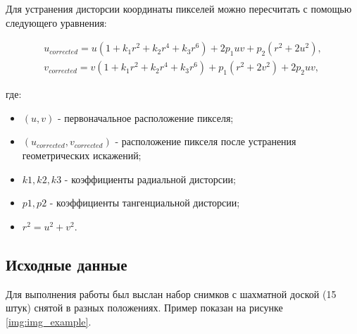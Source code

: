 	Для устранения дисторсии координаты пикселей можно пересчитать с помощью следующего уравнения:
	
	\begin{gather*}
		u_{corrected} = u(1 + k_1 r^2 + k_2 r^4 + k_3 r^6) + 2 p_1 u v + p_2 (r^2 + 2 u^2) , \\
		v_{corrected} = v(1 + k_1 r^2 + k_2 r^4 + k_3 r^6) + p_1 (r^2 + 2 v^2) + 2 p_2 u v ,
	\end{gather*}
	
	где: 
	\begin{itemize}
		\renewcommand{\labelitemi}{--}
		\item $(u, v)$ - первоначальное расположение пикселя;
		\item $(u_{corrected}, v_{corrected})$ - расположение пикселя после устранения геометрических искажений;
		\item $k1, k2, k3$ - коэффициенты радиальной дисторсии;
		\item $p1, p2$ - коэффициенты тангенциальной дисторсии;
		\item $r^2 = u^2 + v^2$.
	\end{itemize}

\subsection{Исходные данные}
	Для выполнения работы был выслан набор снимков с шахматной доской (15 штук) снятой в разных положениях. Пример показан на рисунке \ref{img:img_example}.
	
